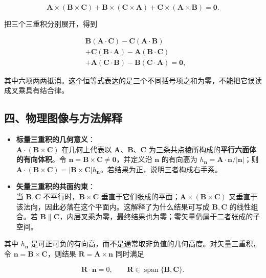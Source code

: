 \[
\boxed{
\mathbf A\times(\mathbf B\times\mathbf C)
+\mathbf B\times(\mathbf C\times\mathbf A)
+\mathbf C\times(\mathbf A\times\mathbf B)=\mathbf0 }.
\]

把三个三重积分别展开，得到

\[
\begin{aligned}
&\mathbf B(\mathbf A\cdot\mathbf C)-\mathbf C(\mathbf A\cdot\mathbf B)\\
&+\mathbf C(\mathbf B\cdot\mathbf A)-\mathbf A(\mathbf B\cdot\mathbf C)\\
&+\mathbf A(\mathbf C\cdot\mathbf B)-\mathbf B(\mathbf C\cdot\mathbf A)=\mathbf0,
\end{aligned}
\]

其中六项两两抵消。这个恒等式表达的是三个不同括号项之和为零，不能把它误读成叉乘具有结合律。

\subsection{四、物理图像与方法解释}\label{m1:ux56dbux7269ux7406ux56feux50cfux4e0eux65b9ux6cd5ux89e3ux91ca}

\begin{itemize}
\tightlist
\item
  \textbf{标量三重积的几何意义}：\\
  \(\mathbf{A} \cdot (\mathbf{B} \times \mathbf{C})\) 在几何上代表以
  \(\mathbf{A}\)、\(\mathbf{B}\)、\(\mathbf{C}\)
  为三条共点棱所构成的\textbf{平行六面体的有向体积}。令
  \(\mathbf n=\mathbf B\times\mathbf C\ne\mathbf0\)，并定义沿
  \(\mathbf n\) 的有向高为
  \(h_{\mathbf n}=\mathbf A\cdot\mathbf n/|\mathbf n|\)；则
  \(\mathbf A\cdot(\mathbf B\times\mathbf C)=|\mathbf B\times\mathbf C|h_{\mathbf n}\)。若结果为正，说明三者构成右手系。
\item
  \textbf{矢量三重积的共面约束}：\\
  当 \(\mathbf B,\mathbf C\) 不平行时，\(\mathbf{B} \times \mathbf{C}\)
  垂直于它们张成的平面；\(\mathbf{A} \times (\mathbf{B} \times \mathbf{C})\)
  又垂直于该法向，因此必落在这个平面内。这解释了为什么结果可写成
  \(\mathbf B,\mathbf C\) 的线性组合。若
  \(\mathbf B\parallel\mathbf C\)，内层叉乘为零，最终结果也为零；零矢量仍属于二者张成的子空间。
\end{itemize}

其中 \(h_{\mathbf n}\)
是可正可负的有向高，而不是通常取非负值的几何高度。对矢量三重积，令
\(\mathbf n=\mathbf B\times\mathbf C\)，则结果
\(\mathbf R=\mathbf A\times\mathbf n\) 同时满足

\[
\mathbf R\cdot\mathbf n=0,
\qquad
\mathbf R\in\operatorname{span}\{\mathbf B,\mathbf C\}.
\]

